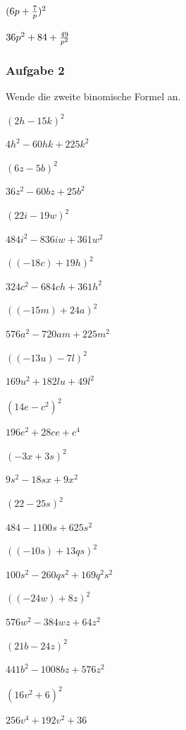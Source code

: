\documentclass[
  ngerman,
]{book}
\begin{document}
\((6p+ {7 \over p})^2\)

\leavevmode\hypertarget{toggleText24}{}%
\(36p^2+ 84 +{49 \over p^2}\)

\hypertarget{aufgabe-2}{%
\subsubsection*{Aufgabe 2}\label{aufgabe-2}}

Wende die zweite binomische Formel an.

\((2h-15k)^2\)

\leavevmode\hypertarget{toggleText25}{}%
\(4h^2-60hk+225k^2\)

\((6z-5b)^2\)

\leavevmode\hypertarget{toggleText26}{}%
\(36z^2-60bz+25b^2\)

\((22i-19w)^2\)

\leavevmode\hypertarget{toggleText27}{}%
\(484i^2-836iw+361w^2\)

\(((-18c)+19h)^2\)

\leavevmode\hypertarget{toggleText28}{}%
\(324c^2-684ch+361h^2\)

\(((-15m)+24a)^2\)

\leavevmode\hypertarget{toggleText29}{}%
\(576a^2-720am+225m^2\)

\(((-13u)-7l)^2\)

\leavevmode\hypertarget{toggleText30}{}%
\(169u^2+182lu+49l^2\)

\((14e-c^2)^2\)

\leavevmode\hypertarget{toggleText31}{}%
\(196e^2+28ce+c^4\)

\((-3x+3s)^2\)

\leavevmode\hypertarget{toggleText32}{}%
\(9s^2-18sx+9x^2\)

\((22-25s)^2\)

\leavevmode\hypertarget{toggleText33}{}%
\(484-1100s+625s^2\)

\(((-10s)+13qs)^2\)

\leavevmode\hypertarget{toggleText34}{}%
\(100s^2-260qs^2+169q^2s^2\)

\(((-24w)+8z)^2\)

\leavevmode\hypertarget{toggleText35}{}%
\(576w^2-384wz+64z^2\)

\((21b-24z)^2\)

\leavevmode\hypertarget{toggleText36}{}%
\(441b^2-1008bz+576z^2\)

\((16v^2+6)^2\)

\leavevmode\hypertarget{toggleText37}{}%
\(256v^4+192v^2+36\)
\end{document}
